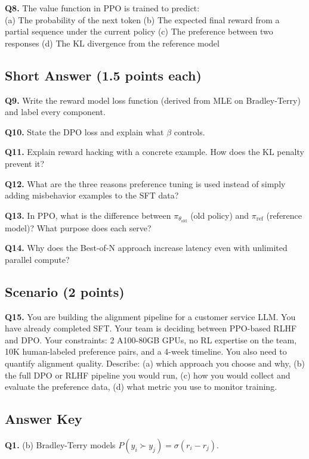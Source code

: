 \documentclass[11pt, a4paper]{article}
\begin{document}
\textbf{Q8.} The value function in PPO is trained to predict:\\
(a) The probability of the next token\quad
(b) The expected final reward from a partial sequence under the current policy\quad
(c) The preference between two responses\quad
(d) The KL divergence from the reference model

\subsection*{Short Answer (1.5 points each)}

\textbf{Q9.} Write the reward model loss function (derived from MLE on Bradley-Terry) and label every component.

\textbf{Q10.} State the DPO loss and explain what $\beta$ controls.

\textbf{Q11.} Explain reward hacking with a concrete example. How does the KL penalty prevent it?

\textbf{Q12.} What are the three reasons preference tuning is used instead of simply adding misbehavior examples to the SFT data?

\textbf{Q13.} In PPO, what is the difference between $\pi_{\theta_\text{old}}$ (old policy) and $\pi_{\text{ref}}$ (reference model)? What purpose does each serve?

\textbf{Q14.} Why does the Best-of-N approach increase latency even with unlimited parallel compute?

\subsection*{Scenario (2 points)}

\textbf{Q15.} You are building the alignment pipeline for a customer service LLM. You have already completed SFT. Your team is deciding between PPO-based RLHF and DPO. Your constraints: 2 A100-80GB GPUs, no RL expertise on the team, 10K human-labeled preference pairs, and a 4-week timeline. You also need to quantify alignment quality. Describe: (a) which approach you choose and why, (b) the full DPO or RLHF pipeline you would run, (c) how you would collect and evaluate the preference data, (d) what metric you use to monitor training.

\newpage
\subsection*{Answer Key}

\textbf{Q1.} (b) Bradley-Terry models $P(y_i \succ y_j) = \sigma(r_i - r_j)$.
\end{document}
